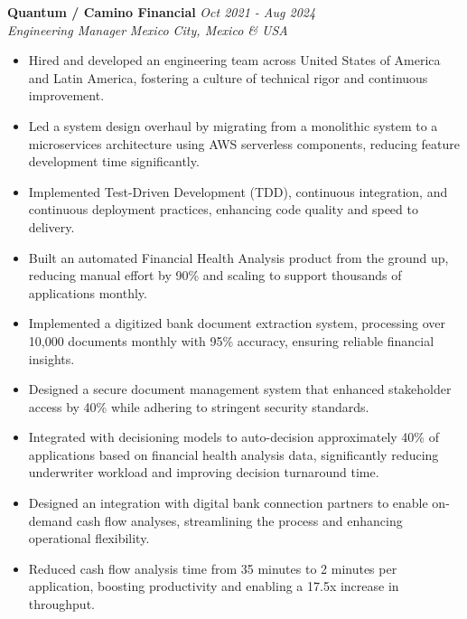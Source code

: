 \documentclass[a4paper,10pt]{article}
\begin{document}
\textbf{Quantum / Camino Financial} \hfill \textit{Oct 2021 - Aug 2024} \\
\textit{Engineering Manager} \hfill \textit{Mexico City, Mexico \& USA} \\
\begin{itemize}[leftmargin=0.5cm, topsep=0pt, parsep=0pt, itemsep=2pt]
	\item Hired and developed an engineering team across United States of
	      America and Latin America, fostering a culture of technical rigor and
	      continuous improvement.
	\item Led a system design overhaul by migrating from a monolithic system to
	      a microservices architecture using AWS serverless components, reducing
	      feature development time significantly.
	\item Implemented Test-Driven Development (TDD), continuous integration, and
	      continuous deployment practices, enhancing code quality and speed to
	      delivery.
	\item Built an automated Financial Health Analysis product from the ground
	      up, reducing manual effort by 90\% and scaling to support thousands of
	      applications monthly.
	\item Implemented a digitized bank document extraction system, processing
	      over 10,000 documents monthly with 95\% accuracy, ensuring reliable
	      financial insights.
	\item Designed a secure document management system that enhanced stakeholder
	      access by 40\% while adhering to stringent security standards.
	\item Integrated with decisioning models to auto-decision approximately 40\%
	      of applications based on financial health analysis data, significantly
	      reducing underwriter workload and improving decision turnaround time.
	\item Designed an integration with digital bank connection partners to
	      enable on-demand cash flow analyses, streamlining the process and
	      enhancing operational flexibility.
	\item Reduced cash flow analysis time from 35 minutes to 2 minutes per
	      application, boosting productivity and enabling a 17.5x increase in
	      throughput.

\end{itemize}
\end{document}
